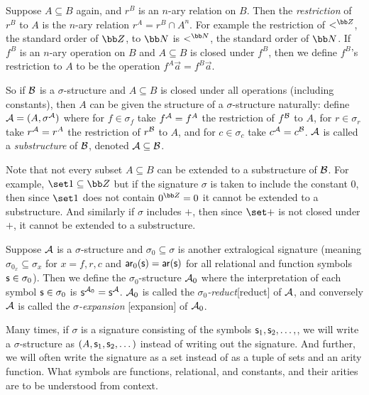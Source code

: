 Suppose $A\subseteq B$ again, and $r^B$ is an $n$-ary relation on $B$.
Then the {\it restriction} of $r^B$ to $A$ is the $n$-ary relation $r^A=r^B\cap A^n$.
For example the restriction of $<^{\bb Z}$, the standard order of ${\bb Z}$, to ${\bb N}$ is $<^{\bb N}$, the standard order of ${\bb N}$.
If $f^B$ is an $n$-ary operation on $B$ and $A\subseteq B$ is closed under $f^B$, then we define $f^B$'s restriction to $A$ to be the operation $f^A\vec a=f^B\vec a$.

So if ${\cal B}$ is a $\sigma$-structure and $A\subseteq B$ is closed under all operations (including constants), then $A$ can be given the structure of a $\sigma$-structure naturally: define
${\cal A}=(A,\sigma^{\cal A})$ where for $f\in\sigma_f$ take $f^{\cal A}=f^A$ the restriction of $f^{\cal B}$ to $A$, for $r\in\sigma_r$ take $r^{\cal A}=r^A$ the restriction of $r^{\cal B}$ to $A$, and
for $c\in\sigma_c$ take $c^{\cal A}=c^{\cal B}$.
${\cal A}$ is called a {\it substructure} of ${\cal B}$, denoted ${\cal A}\subseteq{\cal B}$.

Note that not every subset $A\subseteq B$ can be extended to a substructure of ${\cal B}$.
For example, $\set1\subseteq{\bb Z}$ but if the signature $\sigma$ is taken to include the constant $0$, then since $\set1$ does not contain $0^{\bb Z}=0$ it cannot be extended to a substructure.
And similarly if $\sigma$ includes $+$, then since $\set+$ is not closed under $+$, it cannot be extended to a substructure.

Suppose ${\cal A}$ is a $\sigma$-structure and $\sigma_0\subseteq\sigma$ is another extralogical signature (meaning $\sigma_{0_x}\subseteq\sigma_x$ for $x=f,r,c$ and ${\sf ar}_0({\sf s})={\sf ar}({\sf s})$
for all relational and function symbols ${\sf s}\in\sigma_0$).
Then we define the $\sigma_0$-structure ${\cal A}_0$ where the interpretation of each symbol ${\sf s}\in\sigma_0$ is ${\sf s}^{{\cal A}_0}={\sf s}^{\cal A}$.
${\cal A}_0$ is called the {\it $\sigma_0$-reduct}[reduct] of ${\cal A}$, and conversely ${\cal A}$ is called the {\it $\sigma$-expansion}%
[expansion] of ${\cal A}_0$.

Many times, if $\sigma$ is a signature consisting of the symbols ${\sf s}_1,{\sf s}_2,\dots,$, we will write a $\sigma$-structure as $(A,{\sf s}_1,{\sf s}_2,\dots)$ instead of writing out the signature.
And further, we will often write the signature as a set instead of as a tuple of sets and an arity function.
What symbols are functions, relational, and constants, and their arities are to be understood from context.

